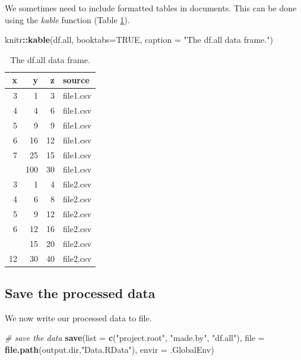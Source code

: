 \documentclass[10pt,]{article}
\newenvironment{Shaded}{\begin{snugshade}}{\end{snugshade}}
\newcommand{\CommentTok}[1]{\textcolor[rgb]{0.56,0.35,0.01}{\textit{#1}}}
\newcommand{\DataTypeTok}[1]{\textcolor[rgb]{0.13,0.29,0.53}{#1}}
\newcommand{\KeywordTok}[1]{\textcolor[rgb]{0.13,0.29,0.53}{\textbf{#1}}}
\newcommand{\NormalTok}[1]{#1}
\newcommand{\OperatorTok}[1]{\textcolor[rgb]{0.81,0.36,0.00}{\textbf{#1}}}
\newcommand{\OtherTok}[1]{\textcolor[rgb]{0.56,0.35,0.01}{#1}}
\newcommand{\StringTok}[1]{\textcolor[rgb]{0.31,0.60,0.02}{#1}}
\begin{document}
We sometimes need to include formatted tables in documents. This can be done using the \emph{kable} function (Table \ref{tab:dfall}).

\begin{Shaded}
\begin{Highlighting}[]
\NormalTok{knitr}\OperatorTok{::}\KeywordTok{kable}\NormalTok{(df.all,}
             \DataTypeTok{booktabs=}\OtherTok{TRUE}\NormalTok{,}
             \DataTypeTok{caption =} \StringTok{"The df.all data frame."}\NormalTok{)}
\end{Highlighting}
\end{Shaded}

\begin{table}[t]

\caption{\label{tab:dfall}The df.all data frame.}
\centering
\begin{tabular}{rrrl}
\toprule
x & y & z & source\\
\midrule
3 & 1 & 3 & file1.csv\\
4 & 4 & 6 & file1.csv\\
5 & 9 & 9 & file1.csv\\
6 & 16 & 12 & file1.csv\\
7 & 25 & 15 & file1.csv\\
\addlinespace
12 & 100 & 30 & file1.csv\\
3 & 1 & 4 & file2.csv\\
4 & 6 & 8 & file2.csv\\
5 & 9 & 12 & file2.csv\\
6 & 12 & 16 & file2.csv\\
\addlinespace
7 & 15 & 20 & file2.csv\\
12 & 30 & 40 & file2.csv\\
\bottomrule
\end{tabular}
\end{table}

\hypertarget{save-the-processed-data}{%
\subsection{Save the processed data}\label{save-the-processed-data}}

We now write our processed data to file.

\begin{Shaded}
\begin{Highlighting}[]
\CommentTok{# save the data}
\KeywordTok{save}\NormalTok{(}\DataTypeTok{list =} \KeywordTok{c}\NormalTok{(}\StringTok{"project.root"}\NormalTok{,}
              \StringTok{"made.by"}\NormalTok{,}
              \StringTok{"df.all"}\NormalTok{),}
       \DataTypeTok{file =} \KeywordTok{file.path}\NormalTok{(output.dir,}\StringTok{"Data.RData"}\NormalTok{),}
       \DataTypeTok{envir =}\NormalTok{ .GlobalEnv)}
\end{Highlighting}
\end{Shaded}
\end{document}
